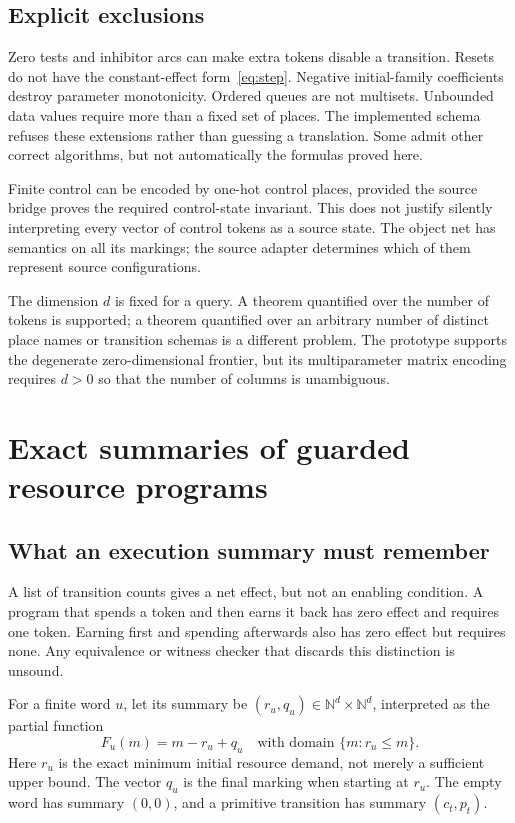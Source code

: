 \documentclass[11pt,a4paper]{article}
\newcommand{\N}{\mathbb N}
\theoremstyle{definition}
\theoremstyle{remark}
\begin{document}
\subsection{Explicit exclusions}
Zero tests and inhibitor arcs can make extra tokens disable a transition. Resets do not have the constant-effect form~\eqref{eq:step}. Negative initial-family coefficients destroy parameter monotonicity. Ordered queues are not multisets. Unbounded data values require more than a fixed set of places. The implemented schema refuses these extensions rather than guessing a translation. Some admit other correct algorithms, but not automatically the formulas proved here.

Finite control can be encoded by one-hot control places, provided the source bridge proves the required control-state invariant. This does not justify silently interpreting every vector of control tokens as a source state. The object net has semantics on all its markings; the source adapter determines which of them represent source configurations.

The dimension $d$ is fixed for a query. A theorem quantified over the number of tokens is supported; a theorem quantified over an arbitrary number of distinct place names or transition schemas is a different problem. The prototype supports the degenerate zero-dimensional frontier, but its multiparameter matrix encoding requires $d>0$ so that the number of columns is unambiguous.

\section{Exact summaries of guarded resource programs}\label{sec:summary}
\subsection{What an execution summary must remember}
A list of transition counts gives a net effect, but not an enabling condition. A program that spends a token and then earns it back has zero effect and requires one token. Earning first and spending afterwards also has zero effect but requires none. Any equivalence or witness checker that discards this distinction is unsound.

For a finite word $u$, let its summary be $(r_u,q_u)\in\N^d\times\N^d$, interpreted as the partial function
\begin{equation}\label{eq:partial}
 F_u(m)=m-r_u+q_u\quad\text{with domain }\{m:r_u\le m\}.
\end{equation}
Here $r_u$ is the exact minimum initial resource demand, not merely a sufficient upper bound. The vector $q_u$ is the final marking when starting at $r_u$. The empty word has summary $(0,0)$, and a primitive transition has summary $(c_t,p_t)$.
\end{document}
